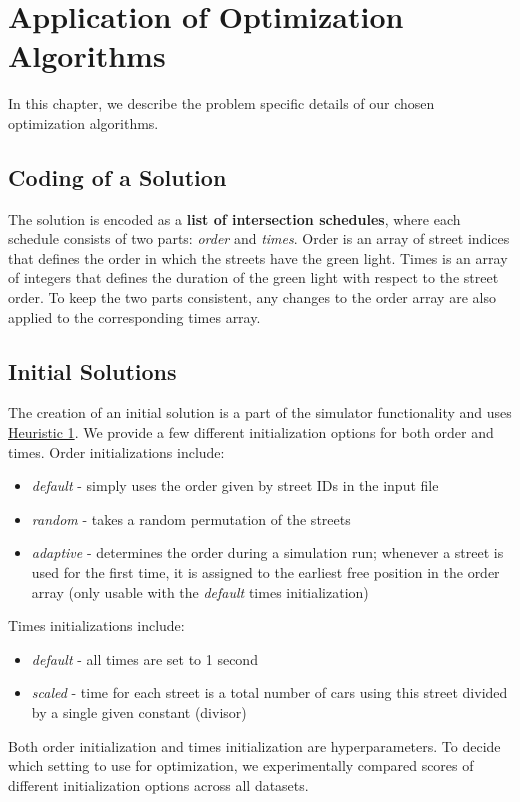 \chapter{Application of Optimization Algorithms}

In this chapter, we describe the problem specific details of our chosen optimization algorithms.

\section{Coding of a Solution} \label{sec:coding_of_a_solution}

The solution is encoded as a \textbf{list of intersection schedules}, where each schedule consists of two parts: \textit{order} and \textit{times}. Order is an array of street indices that defines the order in which the streets have the green light. Times is an array of integers that defines the duration of the green light with respect to the street order. To keep the two parts consistent, any changes to the order array are also applied to the corresponding times array.

\section{Initial Solutions} \label{sec:initial_solutions}

The creation of an initial solution is a part of the simulator functionality and uses \hyperref[para:heuristic_1]{Heuristic 1}.
We provide a few different initialization options for both order and times. Order initializations include:
\begin{itemize}
    \item \textit{default} - simply uses the order given by street IDs in the input file
    \item \textit{random} - takes a random permutation of the streets
    \item \textit{adaptive} - determines the order during a simulation run; whenever a street is used for the first time, it is assigned to the earliest free position in the order array (only usable with the \textit{default} times initialization)
\end{itemize}
Times initializations include:
\begin{itemize}
    \item \textit{default} - all times are set to 1 second
    \item \textit{scaled} - time for each street is a total number of cars using this street divided by a single given constant (divisor)
\end{itemize}
Both order initialization and times initialization are hyperparameters. To decide which setting to use for optimization, we experimentally compared scores of different initialization options across all datasets.

